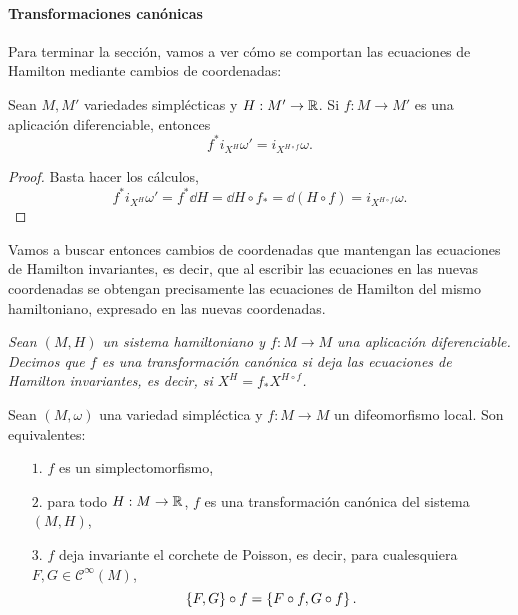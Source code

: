 \paragraph{\bf Transformaciones canónicas}\mbox{}

  Para terminar la sección, vamos a ver cómo se comportan las ecuaciones de Hamilton mediante cambios de coordenadas:
\begin{prop}
 Sean $M,M'$ variedades simplécticas y $H:M'\rightarrow \mathbb{R}$. Si $f:M\rightarrow M'$ es una aplicación diferenciable, entonces 
 \begin{equation*}
   f^*i_{X^H}\omega'=i_{X^{H\circ f}}\omega.
 \end{equation*}
\end{prop}
\begin{proof}
  Basta hacer los cálculos,
  \begin{equation*}
    f^*i_{X^H}\omega'=f^*\dd H=\dd H \circ f_* = \dd (H\circ f)=i_{X^{H\circ f}}\omega.
  \end{equation*}
\end{proof}
Vamos a buscar entonces cambios de coordenadas que mantengan las ecuaciones de Hamilton invariantes, es decir, que al escribir las ecuaciones en las nuevas coordenadas se obtengan precisamente las ecuaciones de Hamilton del mismo hamiltoniano, expresado en las nuevas coordenadas.
\begin{defn}
  \em
  Sean $(M,H)$ un sistema hamiltoniano y $f:M\rightarrow M$ una aplicación diferenciable. Decimos que $f$ es una \emph{transformación canónica} si deja las ecuaciones de Hamilton invariantes, es decir, si $X^H=f_*X^{H\circ f}$.
\end{defn}

\begin{prop}\label{cambiohamilton}
  Sean $(M,\omega)$ una variedad simpléctica y $f:M\rightarrow M$ un difeomorfismo local. Son equivalentes:
  \begin{enumerate}
    \item[$1$.] $f$ es un simplectomorfismo,
    \item[$2$.] para todo $H:M\rightarrow \mathbb{R}$, $f$ es una transformación canónica del sistema $(M,H)$,
    \item[$3$.] $f$ deja invariante el corchete de Poisson, es decir, para cualesquiera $F,G\in \mathscr{C}^{\infty}(M)$, 
      \begin{equation*}
	\left\lbrace F,G\right\rbrace\circ f=\left\lbrace F\circ f,G\circ f\right\rbrace.
      \end{equation*}
  \end{enumerate}
\end{prop}

